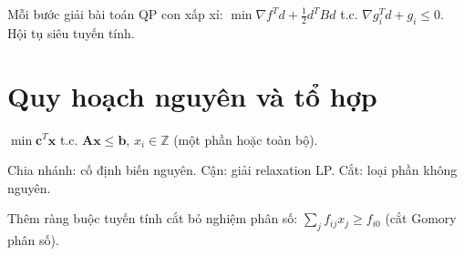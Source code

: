 \documentclass[12pt,a4paper]{article}
\begin{document}
\begin{phuongphap}[title={SQP --- Sequential Quadratic Programming}]
  Mỗi bước giải bài toán QP con xấp xỉ: $\min \nabla f^T d + \tfrac{1}{2}d^T B d$ t.c. $\nabla g_i^T d + g_i \le 0$. Hội tụ siêu tuyến tính.
\end{phuongphap}

\section{Quy hoạch nguyên và tổ hợp}

\begin{dinhnghia}[title={Quy hoạch nguyên}]
  $\min \mathbf{c}^T\mathbf{x}$ t.c. $\mathbf{A}\mathbf{x} \le \mathbf{b}$, $x_i \in \mathbb{Z}$ (một phần hoặc toàn bộ).
\end{dinhnghia}

\begin{phuongphap}[title={Nhánh cận (Branch \& Bound)}]
  Chia nhánh: cố định biến nguyên. Cận: giải relaxation LP. Cắt: loại phần không nguyên.
\end{phuongphap}

\begin{phuongphap}[title={Mặt cắt (Cutting Plane --- Gomory)}]
  Thêm ràng buộc tuyến tính cắt bỏ nghiệm phân số: $\sum_j f_{ij}x_j \ge f_{i0}$ (cắt Gomory phân số).
\end{phuongphap}
\end{document}
